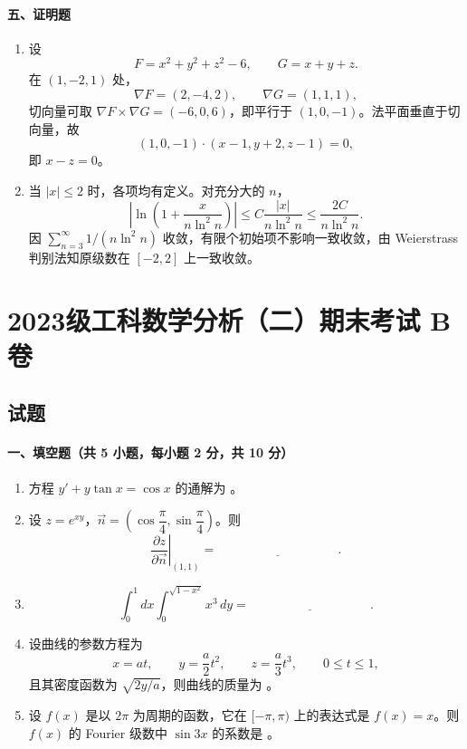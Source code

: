 \paragraph{五、证明题}
\begin{enumerate}
  \item 设
  \[
    F=x^2+y^2+z^2-6,\qquad G=x+y+z.
  \]
  在 $(1,-2,1)$ 处，
  \[
    \nabla F=(2,-4,2),\qquad \nabla G=(1,1,1),
  \]
  切向量可取 $\nabla F\times\nabla G=(-6,0,6)$，即平行于 $(1,0,-1)$。法平面垂直于切向量，故
  \[
    (1,0,-1)\cdot(x-1,y+2,z-1)=0,
  \]
  即 $x-z=0$。
  \item 当 $|x|\le2$ 时，各项均有定义。对充分大的 $n$，
  \[
    \left|\ln\left(1+\frac{x}{n\ln^2n}\right)\right|
    \le C\frac{|x|}{n\ln^2n}
    \le \frac{2C}{n\ln^2n}.
  \]
  因 $\sum_{n=3}^\infty 1/(n\ln^2n)$ 收敛，有限个初始项不影响一致收敛，由 Weierstrass 判别法知原级数在 $[-2,2]$ 上一致收敛。
\end{enumerate}

\section{2023级工科数学分析（二）期末考试 B 卷}

\subsection{试题}

\paragraph{一、填空题（共 5 小题，每小题 2 分，共 10 分）}
\begin{enumerate}
  \item 方程 $y'+y\tan x=\cos x$ 的通解为 \underline{\hspace{4cm}}。
  \item 设 $z=e^{xy}$，$\vec n=\left(\cos\dfrac{\pi}{4},\sin\dfrac{\pi}{4}\right)$。则
  \[
    \left.\frac{\partial z}{\partial \vec n}\right|_{(1,1)}=\underline{\hspace{4cm}}.
  \]
  \item
  \[
    \int_0^1 dx\int_0^{\sqrt{1-x^2}}x^3\,dy=\underline{\hspace{4cm}}.
  \]
  \item 设曲线的参数方程为
  \[
    x=at,\qquad y=\frac a2t^2,\qquad z=\frac a3t^3,\qquad 0\le t\le 1,
  \]
  且其密度函数为 $\sqrt{2y/a}$，则曲线的质量为 \underline{\hspace{4cm}}。
  \item 设 $f(x)$ 是以 $2\pi$ 为周期的函数，它在 $[-\pi,\pi)$ 上的表达式是 $f(x)=x$。则 $f(x)$ 的 Fourier 级数中 $\sin 3x$ 的系数是 \underline{\hspace{4cm}}。
\end{enumerate}

